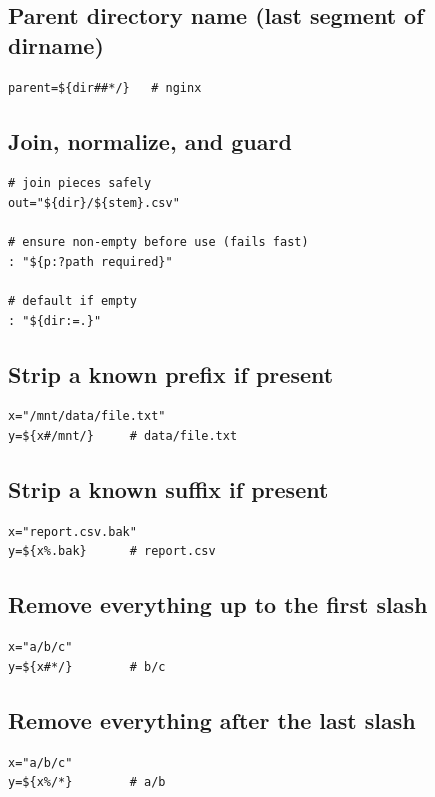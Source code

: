\documentclass[11pt]{article}
\begin{document}
\subsection{Parent directory name (last segment of dirname)}
\begin{lstlisting}
parent=${dir##*/}   # nginx
\end{lstlisting}

\subsection{Join, normalize, and guard}
\begin{lstlisting}
# join pieces safely
out="${dir}/${stem}.csv"

# ensure non-empty before use (fails fast)
: "${p:?path required}"

# default if empty
: "${dir:=.}"
\end{lstlisting}

\subsection{Strip a known prefix if present}
\begin{lstlisting}
x="/mnt/data/file.txt"
y=${x#/mnt/}     # data/file.txt
\end{lstlisting}

\subsection{Strip a known suffix if present}
\begin{lstlisting}
x="report.csv.bak"
y=${x%.bak}      # report.csv
\end{lstlisting}

\subsection{Remove everything up to the first slash}
\begin{lstlisting}
x="a/b/c"
y=${x#*/}        # b/c
\end{lstlisting}

\subsection{Remove everything after the last slash}
\begin{lstlisting}
x="a/b/c"
y=${x%/*}        # a/b
\end{lstlisting}
\end{document}
